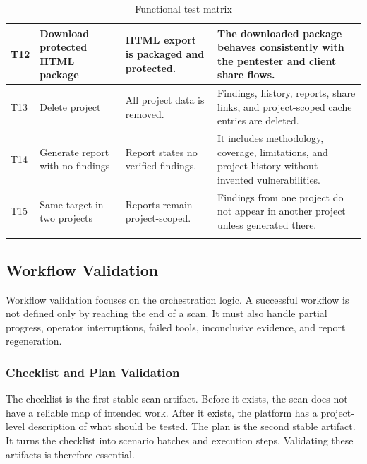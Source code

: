 \documentclass[12pt,a4paper]{report}
\begin{document}
\begin{longtable}{|p{}|p{}|p{}|p{}|}
T12 & Download protected HTML package & HTML export is packaged and protected. & The
downloaded package behaves consistently with the pentester and client share flows. \\
\hline
T13 & Delete project & All project data is removed. & Findings, history, reports,
share links, and project-scoped cache entries are deleted. \\
\hline
T14 & Generate report with no findings & Report states no verified findings. & It
includes methodology, coverage, limitations, and project history without invented
vulnerabilities. \\
\hline
T15 & Same target in two projects & Reports remain project-scoped. & Findings from one
project do not appear in another project unless generated there. \\
\hline
\caption{Functional test matrix}
\label{tab:functional_test_matrix}
\end{longtable}

\subsection{Workflow Validation}

Workflow validation focuses on the orchestration logic. A successful workflow is not
defined only by reaching the end of a scan. It must also handle partial progress,
operator interruptions, failed tools, inconclusive evidence, and report regeneration.

\subsubsection{Checklist and Plan Validation}

The checklist is the first stable scan artifact. Before it exists, the scan does not
have a reliable map of intended work. After it exists, the platform has a project-level
description of what should be tested. The plan is the second stable artifact. It turns
the checklist into scenario batches and execution steps. Validating these artifacts is
therefore essential.
\end{document}
